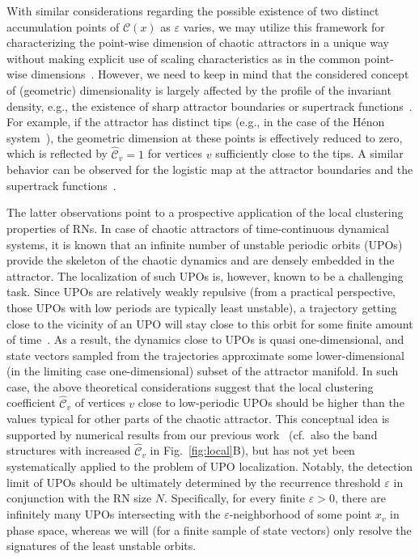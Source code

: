 With similar considerations regarding the possible existence of two distinct accumulation points of $\mathcal{C}(x)$ as $\varepsilon$ varies, we may utilize this framework for characterizing the point-wise dimension of chaotic attractors in a unique way without making explicit use of scaling characteristics as in the common point-wise dimensions~\cite{Donner2011EPJB}. However, we need to keep in mind that the considered concept of (geometric) dimensionality is largely affected by the profile of the invariant density, e.g., the existence of sharp attractor boundaries or supertrack functions~\cite{Donner2010Nolta,Donner2011EPJB,Donner2010NJP}. For example, if the attractor has distinct tips (e.g., in the case of the H\'enon system~\cite{Donner2011EPJB,Donner2010NJP}), the geometric dimension at these points is effectively reduced to zero, which is reflected by $\hat{\mathcal{C}}_v=1$ for vertices $v$ sufficiently close to the tips. A similar behavior can be observed for the logistic map at the attractor boundaries and the supertrack functions~\cite{Donner2010Nolta,Donner2011EPJB,Donner2010NJP}.

The latter observations point to a prospective application of the local clustering properties of RNs. In case of chaotic attractors of time-continuous dynamical systems, it is known that an infinite number of unstable periodic orbits (UPOs) provide the skeleton of the chaotic dynamics and are densely embedded in the attractor. The localization of such UPOs is, however, known to be a challenging task. Since UPOs are relatively weakly repulsive (from a practical perspective, those UPOs with low periods are typically least unstable), a trajectory getting close to the vicinity of an UPO will stay close to this orbit for some finite amount of time~\cite{Lathrop1989}. As a result, the dynamics close to UPOs is quasi one-dimensional, and state vectors sampled from the trajectories approximate some lower-dimensional (in the limiting case one-dimensional) subset of the attractor manifold. In such case, the above theoretical considerations suggest that the local clustering coefficient $\hat{\mathcal{C}}_v$ of vertices $v$ close to low-periodic UPOs should be higher than the values typical for other parts of the chaotic attractor. This conceptual idea is supported by numerical results from our previous work~\cite{Donner2010PRE,Donner2010NJP} (cf.\, also the band structures with increased $\hat{\mathcal{C}}_v$ in Fig.~\ref{fig:local}B), but has not yet been systematically applied to the problem of UPO localization. Notably, the detection limit of UPOs should be ultimately determined by the recurrence threshold $\varepsilon$ in conjunction with the RN size $N$. Specifically, for every finite $\varepsilon>0$, there are infinitely many UPOs intersecting with the $\varepsilon$-neighborhood of some point $x_v$ in phase space, whereas we will (for a finite sample of state vectors) only resolve the signatures of the least unstable orbits.









